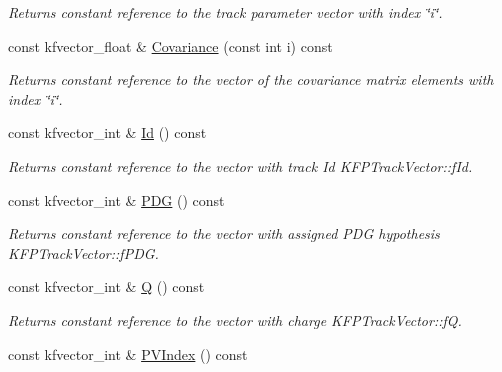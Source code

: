 \begin{DoxyCompactItemize}
\begin{DoxyCompactList}\small\item\em Returns constant reference to the track parameter vector with index \char`\"{}i\char`\"{}. \end{DoxyCompactList}\item 
const kfvector\+\_\+float \& \hyperlink{classKFPTrackVector_a345efcd36e9ae91430d6012cd6df6fcb}{Covariance} (const int i) const \hypertarget{classKFPTrackVector_a345efcd36e9ae91430d6012cd6df6fcb}{}\label{classKFPTrackVector_a345efcd36e9ae91430d6012cd6df6fcb}

\begin{DoxyCompactList}\small\item\em Returns constant reference to the vector of the covariance matrix elements with index \char`\"{}i\char`\"{}. \end{DoxyCompactList}\item 
const kfvector\+\_\+int \& \hyperlink{classKFPTrackVector_a16ad13f2ceada3aa0f08d63e37983ede}{Id} () const \hypertarget{classKFPTrackVector_a16ad13f2ceada3aa0f08d63e37983ede}{}\label{classKFPTrackVector_a16ad13f2ceada3aa0f08d63e37983ede}

\begin{DoxyCompactList}\small\item\em Returns constant reference to the vector with track Id K\+F\+P\+Track\+Vector\+::f\+Id. \end{DoxyCompactList}\item 
const kfvector\+\_\+int \& \hyperlink{classKFPTrackVector_a29298d91b0824b59e334a302ce09d97d}{P\+DG} () const \hypertarget{classKFPTrackVector_a29298d91b0824b59e334a302ce09d97d}{}\label{classKFPTrackVector_a29298d91b0824b59e334a302ce09d97d}

\begin{DoxyCompactList}\small\item\em Returns constant reference to the vector with assigned P\+DG hypothesis K\+F\+P\+Track\+Vector\+::f\+P\+DG. \end{DoxyCompactList}\item 
const kfvector\+\_\+int \& \hyperlink{classKFPTrackVector_afdbad4270667f37d91af768a76e96595}{Q} () const \hypertarget{classKFPTrackVector_afdbad4270667f37d91af768a76e96595}{}\label{classKFPTrackVector_afdbad4270667f37d91af768a76e96595}

\begin{DoxyCompactList}\small\item\em Returns constant reference to the vector with charge K\+F\+P\+Track\+Vector\+::fQ. \end{DoxyCompactList}\item 
const kfvector\+\_\+int \& \hyperlink{classKFPTrackVector_af295551842a8cef49391f3f2659d4918}{P\+V\+Index} () const \hypertarget{classKFPTrackVector_af295551842a8cef49391f3f2659d4918}{}\label{classKFPTrackVector_af295551842a8cef49391f3f2659d4918}


\end{DoxyCompactItemize}
